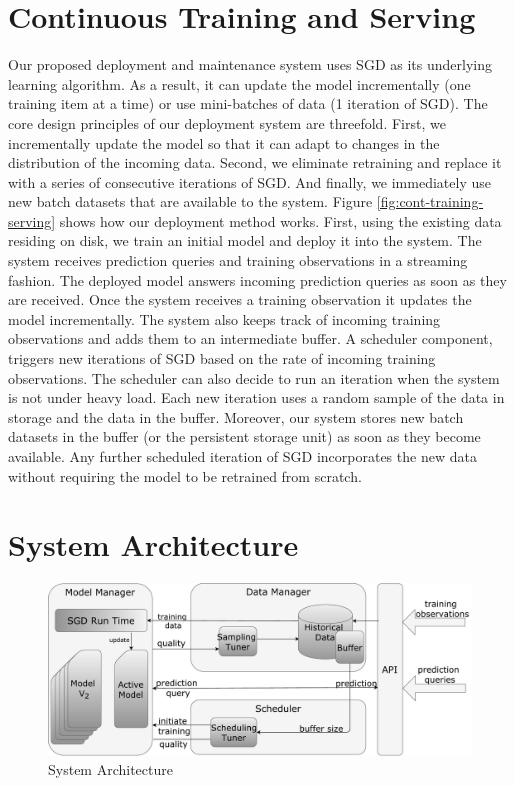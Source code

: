 \documentclass{vldb}
\begin{document}
\section{Continuous Training and Serving} \label{continious-training-serving}
Our proposed deployment and maintenance system uses SGD as its underlying learning algorithm.
As a result, it can update the model incrementally (one training item at a time) or use mini-batches of data (1 iteration of SGD).
The core design principles of our deployment system are threefold.
First, we incrementally update the model so that it can adapt to changes in the distribution of the incoming data.
Second, we eliminate retraining and replace it with a series of consecutive iterations of SGD.
And finally, we immediately use new batch datasets that are available to the system.
Figure \ref{fig:cont-training-serving} shows how our deployment method works.
First, using the existing data residing on disk, we train an initial model and deploy it into the system.
The system receives prediction queries and training observations in a streaming fashion.
The deployed model answers incoming prediction queries as soon as they are received.
Once the system receives a training observation it updates the model incrementally.
The system also keeps track of incoming training observations and adds them to an intermediate buffer.
A scheduler component, triggers new iterations of SGD based on the rate of incoming training observations. 
The scheduler can also decide to run an iteration when the system is not under heavy load.
Each new iteration uses a random sample of the data in storage and the data in the buffer. 
Moreover, our system stores new batch datasets in the buffer (or the persistent storage unit) as soon as they become available.
Any further scheduled iteration of SGD incorporates the new data without requiring the model to be retrained from scratch.

\section{System Architecture} \label{sec:system-architecutre}
\begin{figure}[t]
\centering
\includegraphics[width=\columnwidth]{../images/system-architecture-final.pdf}
\caption{System Architecture}
\label{fig:system-architecture}
\end{figure}
\end{document}
